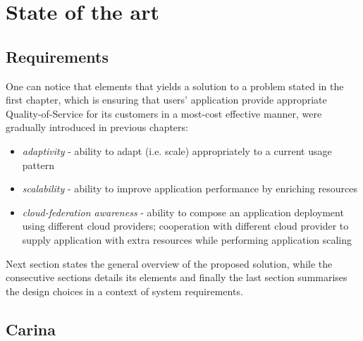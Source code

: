 \chapter{State of the art} 


\section{Requirements}
One can notice that elements that yields a solution to a problem stated in the first chapter, which is ensuring that users' application provide appropriate Quality-of-Service for its customers in a most-cost effective manner, were gradually introduced in previous chapters:

\begin{itemize}
	\item \emph{adaptivity} - ability to adapt (i.e. scale) appropriately to a current usage pattern
	\item \emph{scalability} - ability to improve application performance by enriching resources
	\item \emph{cloud-federation awareness} - ability to compose an application deployment using different cloud providers; cooperation with different cloud provider to supply application with extra resources while performing application scaling
\end{itemize}

Next section states the general overview of the proposed solution, while the consecutive sections details its elements and finally the last section summarises the design choices in a context of system requirements.
	
\section{Carina}

